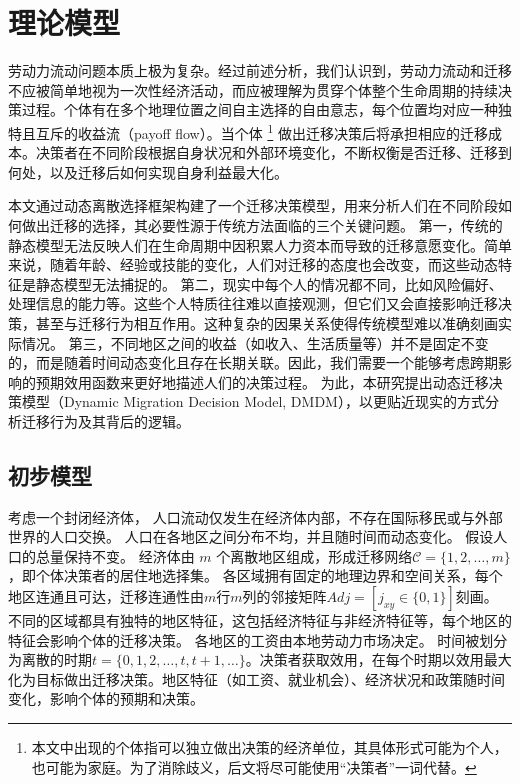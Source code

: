 \documentclass[a4paper, zihao=-4, fontset = mac, oneside]{ctexbook} %
\let\oldfootnote\footnote
\renewcommand{\footnote}[1]{%
  \oldfootnote{\setstretch{1.5}#1}%
}
\begin{document}
\chapter{理论模型}

劳动力流动问题本质上极为复杂。经过前述分析，我们认识到，劳动力流动和迁移不应被简单地视为一次性经济活动，而应被理解为贯穿个体整个生命周期的持续决策过程。个体有在多个地理位置之间自主选择的自由意志，每个位置均对应一种独特且互斥的收益流（payoff flow）。当个体\footnote{本文中出现的个体指可以独立做出决策的经济单位，其具体形式可能为个人，也可能为家庭。为了消除歧义，后文将尽可能使用“决策者”一词代替。}做出迁移决策后将承担相应的迁移成本。决策者在不同阶段根据自身状况和外部环境变化，不断权衡是否迁移、迁移到何处，以及迁移后如何实现自身利益最大化。


本文通过动态离散选择框架构建了一个迁移决策模型，用来分析人们在不同阶段如何做出迁移的选择，其必要性源于传统方法面临的三个关键问题。
第一，传统的静态模型无法反映人们在生命周期中因积累人力资本而导致的迁移意愿变化。简单来说，随着年龄、经验或技能的变化，人们对迁移的态度也会改变，而这些动态特征是静态模型无法捕捉的。  
第二，现实中每个人的情况都不同，比如风险偏好、处理信息的能力等。这些个人特质往往难以直接观测，但它们又会直接影响迁移决策，甚至与迁移行为相互作用。这种复杂的因果关系使得传统模型难以准确刻画实际情况。  
第三，不同地区之间的收益（如收入、生活质量等）并不是固定不变的，而是随着时间动态变化且存在长期关联。因此，我们需要一个能够考虑跨期影响的预期效用函数来更好地描述人们的决策过程。  
为此，本研究提出动态迁移决策模型（Dynamic Migration Decision Model, DMDM），以更贴近现实的方式分析迁移行为及其背后的逻辑。

\section{初步模型}

考虑一个封闭经济体，
人口流动仅发生在经济体内部，不存在国际移民或与外部世界的人口交换。
人口在各地区之间分布不均，并且随时间而动态变化。
假设人口的总量保持不变。
经济体由 $m$ 个离散地区组成，形成迁移网络$\mathcal{C} = \{1,2,\dots,m\}$，即个体决策者的居住地选择集。
各区域拥有固定的地理边界和空间关系，每个地区连通且可达，迁移连通性由$m$行$m$列的邻接矩阵$Adj=[j_{xy}\in\{0,1\}]$刻画。
不同的区域都具有独特的地区特征，这包括经济特征与非经济特征等，每个地区的特征会影响个体的迁移决策。
各地区的工资由本地劳动力市场决定。
时间被划分为离散的时期$t=\{0,1,2,\ldots,t,t+1,\ldots\}$。决策者获取效用，在每个时期以效用最大化为目标做出迁移决策。地区特征（如工资、就业机会）、经济状况和政策随时间变化，影响个体的预期和决策。
\end{document}
